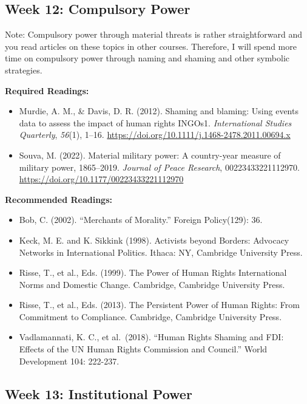 \documentclass[
  letterpaper,
  DIV=11,
  numbers=noendperiod]{scrartcl}
\providecommand{\tightlist}{%
  \setlength{\itemsep}{0pt}\setlength{\parskip}{0pt}}\usepackage{longtable,booktabs,array}
\begin{document}
\hypertarget{week-12-compulsory-power}{%
\subsection*{Week 12: Compulsory Power}\label{week-12-compulsory-power}}

Note: Compulsory power through material threats is rather
straightforward and you read articles on these topics in other courses.
Therefore, I will spend more time on compulsory power through naming and
shaming and other symbolic strategies.

\textbf{Required Readings:}

\begin{itemize}
\tightlist
\item
  Murdie, A. M., \& Davis, D. R. (2012). Shaming and blaming: Using
  events data to assess the impact of human rights {INGOs}1.
  \emph{International Studies Quarterly}, \emph{56}(1), 1--16.
  \url{https://doi.org/10.1111/j.1468-2478.2011.00694.x}
\item
  Souva, M. (2022). Material military power: A country-year measure of
  military power, 1865--2019. \emph{Journal of Peace Research},
  00223433221112970. \url{https://doi.org/10.1177/00223433221112970}
\end{itemize}

\textbf{Recommended Readings:}

\begin{itemize}
\tightlist
\item
  Bob, C. (2002). ``Merchants of Morality.'' Foreign Policy(129): 36.
\item
  Keck, M. E. and K. Sikkink (1998). Activists beyond Borders: Advocacy
  Networks in International Politics. Ithaca: NY, Cambridge University
  Press.
\item
  Risse, T., et al., Eds. (1999). The Power of Human Rights
  International Norms and Domestic Change. Cambridge, Cambridge
  University Press.
\item
  Risse, T., et al., Eds. (2013). The Persistent Power of Human Rights:
  From Commitment to Compliance. Cambridge, Cambridge University Press.
\item
  Vadlamannati, K. C., et al.~(2018). ``Human Rights Shaming and FDI:
  Effects of the UN Human Rights Commission and Council.'' World
  Development 104: 222-237.
\end{itemize}

\hypertarget{week-13-institutional-power}{%
\subsection*{Week 13: Institutional
Power}\label{week-13-institutional-power}}
\end{document}
